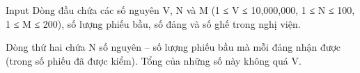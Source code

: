 Input
Dòng đầu chứa các số nguyên V, N và M (1 ≤ V ≤ 10,000,000, 1 ≤ N ≤ 100, 1 ≤ M ≤ 200), số lượng phiếu bầu, số đảng và số ghế trong nghị viện.  

   Dòng thứ hai chứa N số nguyên – số lượng phiếu bầu mà mỗi đảng nhận được (trong số phiếu đã được kiểm). Tổng của những số này không quá V.